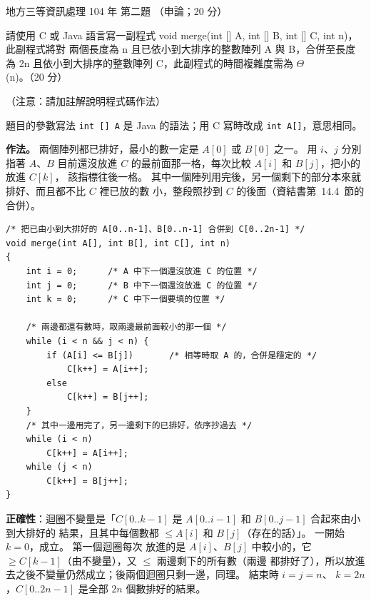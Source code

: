 \begin{pastexam}[label={px:df3-104-ds-02}]{地方三等資訊處理 104 年 第二題}
（申論；20 分）

請使用 C 或 Java 語言寫一副程式 void merge(int [] A, int [] B, int [] C, int n)，此副程式將對
兩個長度為 n 且已依小到大排序的整數陣列 A 與 B，合併至長度為 2n 且依小到大排序的整數陣列
C，此副程式的時間複雜度需為 $\Theta$(n)。（20 分）

（注意：請加註解說明程式碼作法）
\end{pastexam}

\begin{pastsoln}
題目的參數寫法 \texttt{int [] A} 是 Java 的語法；用 C 寫時改成 \texttt{int A[]}，意思相同。

\textbf{作法。} 兩個陣列都已排好，最小的數一定是 $A[0]$ 或 $B[0]$ 之一。 用 $i$、$j$ 分別指著
$A$、$B$ 目前還沒放進 $C$ 的最前面那一格，每次比較 $A[i]$ 和 $B[j]$，把小的放進 $C[k]$，
該指標往後一格。 其中一個陣列用完後，另一個剩下的部分本來就排好、而且都不比 $C$ 裡已放的數
小，整段照抄到 $C$ 的後面（資結書第~14.4~節的合併）。
\begin{verbatim}
/* 把已由小到大排好的 A[0..n-1]、B[0..n-1] 合併到 C[0..2n-1] */
void merge(int A[], int B[], int C[], int n)
{
    int i = 0;      /* A 中下一個還沒放進 C 的位置 */
    int j = 0;      /* B 中下一個還沒放進 C 的位置 */
    int k = 0;      /* C 中下一個要填的位置 */

    /* 兩邊都還有數時，取兩邊最前面較小的那一個 */
    while (i < n && j < n) {
        if (A[i] <= B[j])       /* 相等時取 A 的，合併是穩定的 */
            C[k++] = A[i++];
        else
            C[k++] = B[j++];
    }
    /* 其中一邊用完了，另一邊剩下的已排好，依序抄過去 */
    while (i < n)
        C[k++] = A[i++];
    while (j < n)
        C[k++] = B[j++];
}
\end{verbatim}

\textbf{正確性}：迴圈不變量是「$C[0..k-1]$ 是 $A[0..i-1]$ 和 $B[0..j-1]$ 合起來由小到大排好的
結果，且其中每個數都 $\le A[i]$ 和 $B[j]$（存在的話）」。 一開始 $k = 0$，成立。 第一個迴圈每次
放進的是 $A[i]$、$B[j]$ 中較小的，它 $\ge C[k-1]$（由不變量），又 $\le$ 兩邊剩下的所有數（兩邊
都排好了），所以放進去之後不變量仍然成立；後兩個迴圈只剩一邊，同理。 結束時 $i = j = n$、
$k = 2n$，$C[0..2n-1]$ 是全部 $2n$ 個數排好的結果。


\end{pastsoln}

